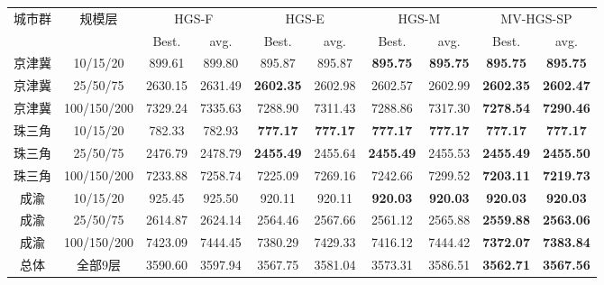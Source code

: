 \begin{tabular*}{\linewidth}{@{\extracolsep{\fill}}cccccccccc@{}}
\toprule
\multirow{2}{*}{城市群} & \multirow{2}{*}{规模层} & \multicolumn{2}{c}{HGS-F} & \multicolumn{2}{c}{HGS-E} & \multicolumn{2}{c}{HGS-M} & \multicolumn{2}{c}{MV-HGS-SP}\\
\cmidrule(lr){3-4}\cmidrule(lr){5-6}\cmidrule(lr){7-8}\cmidrule(lr){9-10}
 & & \multicolumn{1}{c}{Best.} & \multicolumn{1}{c}{avg.} & \multicolumn{1}{c}{Best.} & \multicolumn{1}{c}{avg.} & \multicolumn{1}{c}{Best.} & \multicolumn{1}{c}{avg.} & \multicolumn{1}{c}{Best.} & \multicolumn{1}{c}{avg.}\\
\midrule
京津冀 & 10/15/20 & 899.61 & 899.80 & 895.87 & 895.87 & \textbf{895.75} & \textbf{895.75} & \textbf{895.75} & \textbf{895.75}\\
京津冀 & 25/50/75 & 2630.15 & 2631.49 & \textbf{2602.35} & 2602.98 & 2602.57 & 2602.99 & \textbf{2602.35} & \textbf{2602.47}\\
京津冀 & 100/150/200 & 7329.24 & 7335.63 & 7288.90 & 7311.43 & 7288.86 & 7317.30 & \textbf{7278.54} & \textbf{7290.46}\\
珠三角 & 10/15/20 & 782.33 & 782.93 & \textbf{777.17} & \textbf{777.17} & \textbf{777.17} & \textbf{777.17} & \textbf{777.17} & \textbf{777.17}\\
珠三角 & 25/50/75 & 2476.79 & 2478.79 & \textbf{2455.49} & 2455.64 & \textbf{2455.49} & 2455.53 & \textbf{2455.49} & \textbf{2455.50}\\
珠三角 & 100/150/200 & 7233.88 & 7258.74 & 7225.09 & 7269.16 & 7242.66 & 7299.52 & \textbf{7203.11} & \textbf{7219.73}\\
成渝 & 10/15/20 & 925.45 & 925.50 & 920.11 & 920.11 & \textbf{920.03} & \textbf{920.03} & \textbf{920.03} & \textbf{920.03}\\
成渝 & 25/50/75 & 2614.87 & 2624.14 & 2564.46 & 2567.66 & 2561.12 & 2565.88 & \textbf{2559.88} & \textbf{2563.06}\\
成渝 & 100/150/200 & 7423.09 & 7444.45 & 7380.29 & 7429.33 & 7416.12 & 7444.42 & \textbf{7372.07} & \textbf{7383.84}\\
总体 & 全部9层 & 3590.60 & 3597.94 & 3567.75 & 3581.04 & 3573.31 & 3586.51 & \textbf{3562.71} & \textbf{3567.56}\\
\bottomrule
\end{tabular*}
